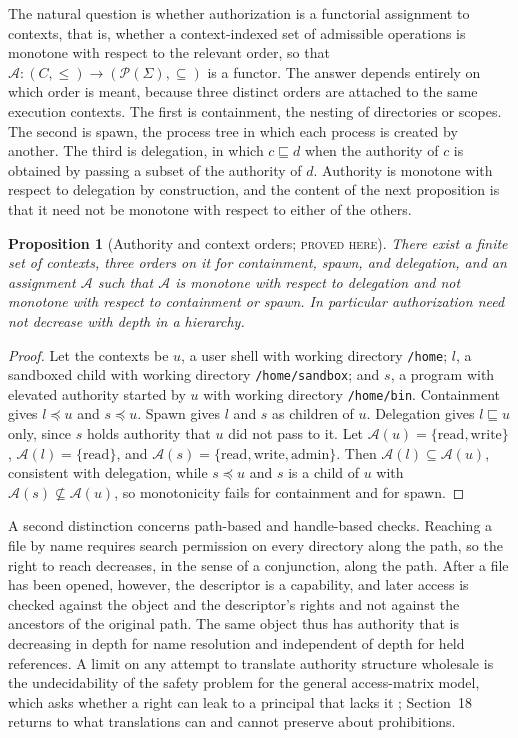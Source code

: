 \documentclass[11pt]{article}
\newtheorem{proposition}[theorem]{Proposition}
\theoremstyle{definition}
\theoremstyle{remark}
\newcommand{\stN}{\textsc{proved here}}
\newcommand{\cA}{\mathcal A}
\begin{document}
The natural question is whether authorization is a functorial assignment to contexts, that is, whether a context-indexed set of admissible operations is monotone with respect to the relevant order, so that $\cA:(C,\le)\to(\mathcal P(\Sigma),\subseteq)$ is a functor. The answer depends entirely on which order is meant, because three distinct orders are attached to the same execution contexts. The first is containment, the nesting of directories or scopes. The second is spawn, the process tree in which each process is created by another. The third is delegation, in which $c\sqsubseteq d$ when the authority of $c$ is obtained by passing a subset of the authority of $d$. Authority is monotone with respect to delegation by construction, and the content of the next proposition is that it need not be monotone with respect to either of the others.

\begin{proposition}[Authority and context orders; \stN]\label{prop:authorders}
There exist a finite set of contexts, three orders on it for containment, spawn, and delegation, and an assignment $\cA$ such that $\cA$ is monotone with respect to delegation and not monotone with respect to containment or spawn. In particular authorization need not decrease with depth in a hierarchy.
\end{proposition}
\begin{proof}
Let the contexts be $u$, a user shell with working directory \texttt{/home}; $l$, a sandboxed child with working directory \texttt{/home/sandbox}; and $s$, a program with elevated authority started by $u$ with working directory \texttt{/home/bin}. Containment gives $l\preceq u$ and $s\preceq u$. Spawn gives $l$ and $s$ as children of $u$. Delegation gives $l\sqsubseteq u$ only, since $s$ holds authority that $u$ did not pass to it. Let $\cA(u)=\{\mathrm{read},\mathrm{write}\}$, $\cA(l)=\{\mathrm{read}\}$, and $\cA(s)=\{\mathrm{read},\mathrm{write},\mathrm{admin}\}$. Then $\cA(l)\subseteq\cA(u)$, consistent with delegation, while $s\preceq u$ and $s$ is a child of $u$ with $\cA(s)\not\subseteq\cA(u)$, so monotonicity fails for containment and for spawn.
\end{proof}

A second distinction concerns path-based and handle-based checks. Reaching a file by name requires search permission on every directory along the path, so the right to reach decreases, in the sense of a conjunction, along the path. After a file has been opened, however, the descriptor is a capability, and later access is checked against the object and the descriptor's rights and not against the ancestors of the original path. The same object thus has authority that is decreasing in depth for name resolution and independent of depth for held references. A limit on any attempt to translate authority structure wholesale is the undecidability of the safety problem for the general access-matrix model, which asks whether a right can leak to a principal that lacks it \cite{hru}; Section~18 returns to what translations can and cannot preserve about prohibitions.
\end{document}
